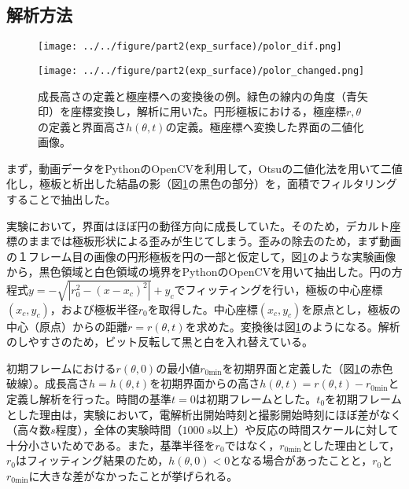 \documentclass[autodetect-engine,dvi=dvipdfmx,a4paper,ja=standard,oneside,openany,11pt]{bxjsbook}
\begin{document}
\subsection{解析方法}
\begin{figure}[htbp]
  \begin{minipage}
    {0.64\textwidth}
    \subcaption{}
    \centering
    \texttt{[image: ../../figure/part2(exp\_surface)/polor\_dif.png]}
    \label{fig:surface_hight_def}
  \end{minipage}
  \begin{minipage}
    {0.32\textwidth}
    \subcaption{}
    \centering
    \texttt{[image: ../../figure/part2(exp\_surface)/polor\_changed.png]}
    \label{fig:polor_changed}
  \end{minipage}
  \caption{成長高さの定義と極座標への変換後の例。緑色の線内の角度（青矢印）を座標変換し，解析に用いた。円形極板における，極座標$r,\theta$の定義と界面高さ$h(\theta,t)$の定義。極座標へ変換した界面の二値化画像。}
  \label{fig:surface_hight_def_polor_changed}
\end{figure}
まず，動画データをPythonのOpenCVを利用して，Otsuの二値化法を用いて二値化し，極板と析出した結晶の影（図\ref{fig:surface_hight_def_polor_changed}の黒色の部分）を，面積でフィルタリングすることで抽出した。

実験において，界面はほぼ円の動径方向に成長していた。そのため，デカルト座標のままでは極板形状による歪みが生じてしまう。歪みの除去のため，まず動画の１フレーム目の画像の円形極板を円の一部と仮定して，図\ref{fig:surface_hight_def_polor_changed}のような実験画像から，黒色領域と白色領域の境界をPythonのOpenCVを用いて抽出した。円の方程式$y=-\sqrt{|r_0^2-(x-x_c)^2|}+y_c$でフィッティングを行い，極板の中心座標$(x_c,y_c)$，および極板半径$r_0$を取得した。中心座標$(x_c,y_c)$を原点とし，極板の中心（原点）からの距離$r=r(\theta,t)$を求めた。変換後は図\ref{fig:surface_hight_def_polor_changed}のようになる。解析のしやすさのため，ビット反転して黒と白を入れ替えている。

初期フレームにおける$r(\theta,0)$の最小値$r_{0\mathrm{min}}$を初期界面と定義した（図\ref{fig:surface_hight_def_polor_changed}の赤色破線）。成長高さ$h=h(\theta,t)$を初期界面からの高さ$h(\theta,t)=r(\theta,t)-r_{0\mathrm{min}}$と定義し解析を行った。時間の基準$t=0$は初期フレームとした。$t_0$を初期フレームとした理由は，実験において，電解析出開始時刻と撮影開始時刻にほぼ差がなく（高々数$\si{s}$程度），全体の実験時間（$\SI{1000}{s}$以上）や反応の時間スケールに対して十分小さいためである。また，基準半径を$r_0$ではなく，$r_{0\mathrm{min}}$とした理由として，$r_0$はフィッティング結果のため，$h(\theta,0)<0$となる場合があったことと，$r_0$と$r_{0\mathrm{min}}$に大きな差がなかったことが挙げられる。
\end{document}

